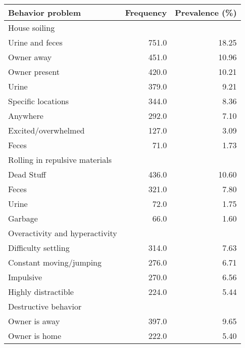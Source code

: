 \documentclass[varwidth=\maxdimen]{standalone}
\newcommand{\subrow}[1]{\hspace{1.25em}#1}
\begin{document}
\begin{tabular}[t]{lrr}
\toprule
Behavior problem &  Frequency &  Prevalence (\%) \\
\midrule
House soiling \\
  \subrow{Urine and feces}                     &      751.0 &           18.25 \\
  \subrow{Owner away}                          &      451.0 &           10.96 \\
  \subrow{Owner present}                       &      420.0 &           10.21 \\
  \subrow{Urine}                               &      379.0 &            9.21 \\
  \subrow{Specific locations}                  &      344.0 &            8.36 \\
  \subrow{Anywhere}                            &      292.0 &            7.10 \\
  \subrow{Excited/overwhelmed}                 &      127.0 &            3.09 \\
  \subrow{Feces}                               &       71.0 &            1.73 \\
Rolling in repulsive materials \\
  \subrow{Dead Stuff}                          &      436.0 &           10.60 \\
  \subrow{Feces}                               &      321.0 &            7.80 \\
  \subrow{Urine}                               &       72.0 &            1.75 \\
  \subrow{Garbage}                             &       66.0 &            1.60 \\
Overactivity and hyperactivity \\
  \subrow{Difficulty settling}                 &      314.0 &            7.63 \\
  \subrow{Constant moving/jumping}             &      276.0 &            6.71 \\
  \subrow{Impulsive}                           &      270.0 &            6.56 \\
  \subrow{Highly distractible}                 &      224.0 &            5.44 \\
Destructive behavior \\
  \subrow{Owner is away}                       &      397.0 &            9.65 \\
  \subrow{Owner is home}                       &      222.0 &            5.40 \\

\end{tabular}
\end{document}
